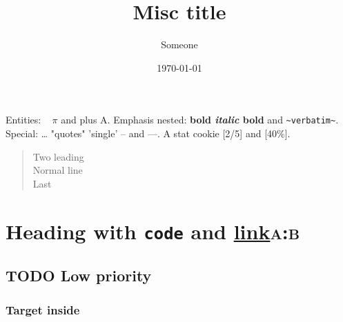 \documentclass[11pt]{article}
\author{Someone}
\date{\today}
\title{Misc \textbf{title}}
\begin{document}
\maketitle
\tableofcontents

Entities: ~ \(\pi\) \textcopyright{} \texteuro{} and \textonehalf{} plus A.
Emphasis nested: \textbf{bold \emph{italic} bold} and \texttt{\textasciitilde{}verbatim\textasciitilde{}}.
Special: \ldots{} "quotes" 'single' -- and ---.
A stat cookie [2/5] and [40\%].

\begin{verse}
\hspace*{2\fontdimen2\font}Two leading\\
Normal line\\
Last\\
\end{verse}
\section{Heading with \texttt{code} and \href{https://x.org}{link}\hfill{}\textsc{a:b}}
\label{sec:org47118c0}
\subsection{{\bfseries\sffamily TODO} Low priority}
\label{sec:orgaf3ed89}
\subsubsection{Target \label{org7bfd295} inside}
\label{sec:org1c59b52}
\end{document}
